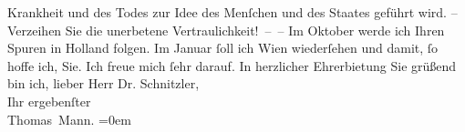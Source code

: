 \begin{ledgroupsized}[t]{13cm}
               Krankheit und des Todes zur Idee des Menſchen und des Staates geführt wird. –
               Verzeihen Sie die unerbetene Vertraulichkeit! – –\pend
           \pstart
           Im Oktober werde ich Ihren Spuren in Holland folgen. Im Januar{ }ſoll ich Wien
               wiederſehen und damit, ſo hoffe ich, Sie. Ich freue mich ſehr darauf.\pend
           \pstart
           In herzlicher Ehrerbietung Sie grüßend bin ich, lieber Herr Dr.
               Schnitzler,{\\[\baselineskip]}Ihr ergebenſter{\\[\baselineskip]}\spacefill\mbox{Thomas Mann.}\pend
           \leftskip=0em{}\endnumbering{}\end{ledgroupsized}  \newcommand{\dateiname}{L02392}\newcommand{\titel}{Thomas Mann an Arthur Schnitzler, 4. 9. 1922}\newcommand{\editorInnen}{Martin Anton Müller und Gerd-Hermann Susen}
            \footnotesize
\begin{ledgroupsized}[t]{11.5cm}
\end{ledgroupsized}
         
      